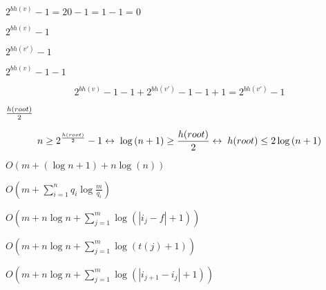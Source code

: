 \documentclass{article}
\begin{document}
$2^{bh(v)} - 1 = 20 - 1 = 1 - 1 = 0$
\pagebreak

$2^{bh(v)}  -  1$
\pagebreak

$2^{bh(v')}  -
1$
\pagebreak

$2^{bh(v)} - 1 - 1$
\pagebreak

\[2^{bh(v)} - 1 - 1 + 2^{bh(v')} - 1 - 1 + 1 = 2^{bh(v')} - 1\]
\pagebreak

$h(root) \over 2$
\pagebreak

\[n \geq 2^{{h(root) \over 2}} - 1 \leftrightarrow  \;  \log{(n+1)}  \geq
{h(root) \over 2} \leftrightarrow \; h(root) \leq 2\log{(n+1)}\]
\pagebreak

$O\left(m + (\log n + 1) + n\log(n) \right)$
\pagebreak

$O\left(m+\sum_{i=1}^n q_i\log\frac{m}{q_i}\right)$
\pagebreak

$O\left(m+n\log   n+\sum_{j=1}^m   \log(|i_j-f|+1)
\right)$
\pagebreak

$O\left(m+n\log  n+\sum_{j=1}^m
\log(t(j)+1) \right)$
\pagebreak

$O\left(m+n\log n+\sum_{j=1}^m \log(|i_{j+1}-i_j|+1) \right)$
\pagebreak
\end{document}
